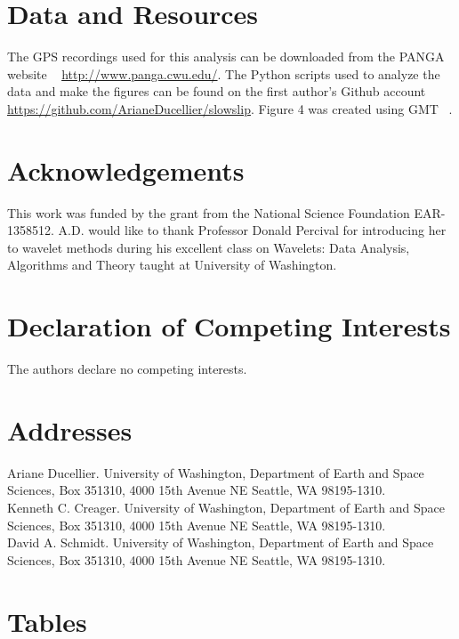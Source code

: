 \documentclass{article}
\begin{document}
\section*{Data and Resources}

The GPS recordings used for this analysis can be downloaded from the PANGA website ~\citep{PANGA} \url{http://www.panga.cwu.edu/}. The Python scripts used to analyze the data and make the figures can be found on the first author's Github account \url{https://github.com/ArianeDucellier/slowslip}. Figure 4 was created using GMT ~\citep{WES_1991}.

\section*{Acknowledgements}

This work was funded by the grant from the National Science Foundation EAR-1358512. A.D. would like to thank Professor Donald Percival for introducing her to wavelet methods during his excellent class on Wavelets: Data Analysis, Algorithms and Theory taught at University of Washington.   

\section*{Declaration of Competing Interests}

The authors declare no competing interests.




\newpage

\section*{Addresses}

Ariane Ducellier. University of Washington, Department of Earth and Space Sciences, Box 351310, 4000 15th Avenue NE Seattle, WA 98195-1310. \\

Kenneth C. Creager. University of Washington, Department of Earth and Space Sciences, Box 351310, 4000 15th Avenue NE Seattle, WA 98195-1310. \\

David A. Schmidt. University of Washington, Department of Earth and Space Sciences, Box 351310, 4000 15th Avenue NE Seattle, WA 98195-1310.

\newpage

\section*{Tables}
\end{document}
